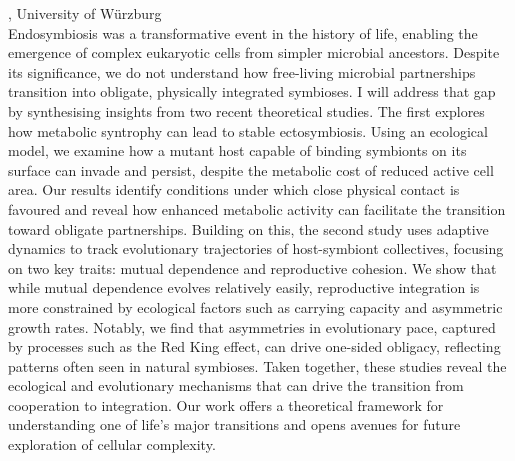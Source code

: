 \documentclass[12pt,a4paper]{article}
\begin{document}
, University of Würzburg \\[2ex] Endosymbiosis was a transformative event in the history of life, enabling the emergence of complex eukaryotic cells from simpler microbial ancestors. Despite its significance, we do not understand how free-living microbial partnerships transition into obligate, physically integrated symbioses. I will address that gap by synthesising insights from two recent theoretical studies. The first explores how metabolic syntrophy can lead to stable ectosymbiosis. Using an ecological model, we examine how a mutant host capable of binding symbionts on its surface can invade and persist, despite the metabolic cost of reduced active cell area. Our results identify conditions under which close physical contact is favoured and reveal how enhanced metabolic activity can facilitate the transition toward obligate partnerships. Building on this, the second study uses adaptive dynamics to track evolutionary trajectories of host-symbiont collectives, focusing on two key traits: mutual dependence and reproductive cohesion. We show that while mutual dependence evolves relatively easily, reproductive integration is more constrained by ecological factors such as carrying capacity and asymmetric growth rates. Notably, we find that asymmetries in evolutionary pace, captured by processes such as the Red King effect, can drive one-sided obligacy, reflecting patterns often seen in natural symbioses. Taken together, these studies reveal the ecological and evolutionary mechanisms that can drive the transition from cooperation to integration. Our work offers a theoretical framework for understanding one of life’s major transitions and opens avenues for future exploration of cellular complexity. 

\bigskip\bigskip

\newpage
\end{document}
